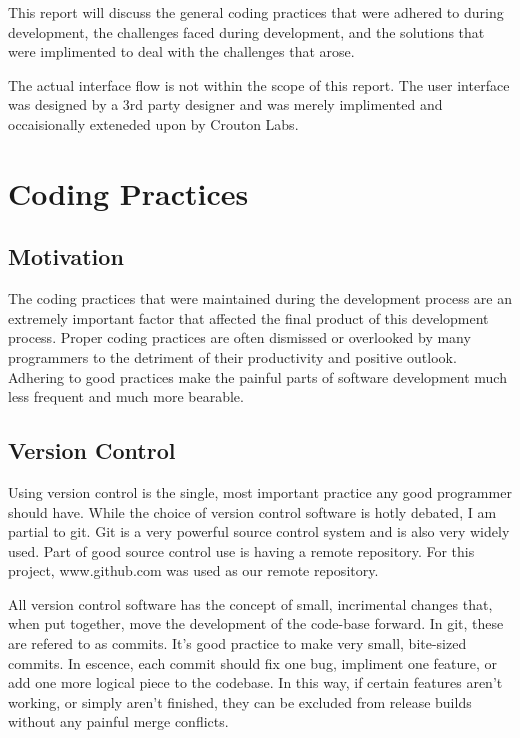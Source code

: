\documentclass[se]{uw-wkrpt}
\begin{document}
This report will discuss the general coding practices that were adhered to
during development, the challenges faced during development, and the solutions
that were implimented to deal with the challenges that arose.

The actual interface flow is not within the scope of this report.
The user interface was designed by a 3rd party designer and was merely
implimented and occaisionally exteneded upon by Crouton Labs.

\section{Coding Practices}

\subsection{Motivation}

The coding practices that were maintained 
during the development process are an extremely
important factor that affected the final product of this development
process. Proper coding 
practices are often dismissed or overlooked by many programmers to
the detriment of their productivity and positive outlook. Adhering to 
good practices make the painful parts of software development much less
frequent and much more bearable.

\subsection{Version Control}

Using version control is the single, most important practice any
good programmer should have. While the choice of version control 
software is hotly debated, I am partial to git. Git is a very
powerful source control system and is also very widely used.
Part of good source control use is having a remote repository.
For this project, www.github.com was used as our remote repository.

All version control software has the concept of small, incrimental
changes that, when put together, move the development of the code-base
forward. In git, these are refered to as commits. It's good practice
to make very small, bite-sized commits. In escence, each commit should
fix one bug, impliment one feature, or add one more logical piece to
the codebase. In this way, if certain features aren't working, or simply
aren't finished, they can be excluded from release builds without any
painful merge conflicts.
\end{document}
